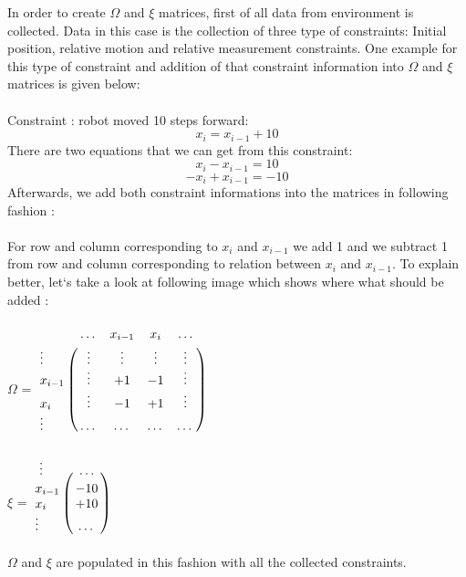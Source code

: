\documentclass{ba-kecs}
\numberwithin{figure}{section}
\numberwithin{equation}{section}
\begin{document}
{In order to create $\Omega$ and $\xi$ matrices, first of all data from environment is collected. Data in this case is the collection of three type of constraints: Initial position, relative motion and relative measurement constraints. One example for this type of constraint and addition of that constraint information into $\Omega$ and $\xi$ matrices is given below:\\ \\
	Constraint : robot moved 10 steps forward: 
	\[ x_{i} = x_{i-1} + 10 \]
	There are two equations that we can get from this constraint:
	\[ x_{i} - x_{i-1} = 10 \]
	\[ -x_{i} + x_{i-1} = -10 \]
	Afterwards, we add both constraint informations into the matrices in following fashion :\\ \\
	For row and column corresponding to $x_{i}$ and $x_{i-1}$ we add 1 and we subtract 1 from row and column corresponding to relation between $x_{i}$ and $x_{i-1}$. To explain better, let`s take a look at following image which shows where what should be added :\\ \\
	$\Omega$ = $\bordermatrix{~ & \dots & x_{i-1} & x_{i} & \dots \cr
							\vdots & \vdots & \vdots & \vdots & \vdots \cr
                  			x_{i-1} & \vdots & +1 & -1 & \vdots \cr
                  			x_{i} & \vdots & -1 & +1 & \vdots \cr
                  			\vdots & \dots & \dots & \dots & \dots \cr}$ \\ \\
                  			
    $\xi$ = $\bordermatrix{~ \vdots & \dots \cr
                  			x_{i-1} & -10 \cr
                  			x_{i}  & +10 \cr
                  			\vdots & \dots \cr}$\\ \\
                  
	$\Omega$ and $\xi$ are populated in this fashion with all the collected constraints.
	
}
\end{document}
